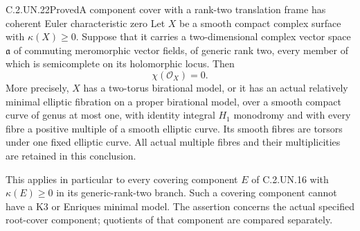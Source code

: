\begin{statement}{C.2.UN.22}{Proved}{A component cover with a rank-two translation frame has coherent Euler characteristic zero}
Let $X$ be a smooth compact complex surface with
$\kappa(X)\ge0$. Suppose that it carries a two-dimensional
complex vector space $\mathfrak a$ of commuting meromorphic
vector fields, of generic rank two, every member of which
is semicomplete on its holomorphic locus. Then
\[
                         \chi(\mathcal O_X)=0.
                                                               \tag{C.RF.5}
\]
More precisely, $X$ has a two-torus birational model,
or it has an actual relatively minimal elliptic fibration
on a proper birational model, over a smooth compact curve
of genus at most one, with identity integral $H_1$ monodromy
and with every fibre a positive multiple of a smooth elliptic
curve. Its smooth fibres are torsors under one fixed elliptic
curve. All actual multiple fibres and their multiplicities
are retained in this conclusion.

This applies in particular to every covering component
$E$ of C.2.UN.16 with $\kappa(E)\ge0$ in its
generic-rank-two branch. Such a covering component cannot
have a K3 or Enriques minimal model. The assertion concerns
the actual specified root-cover component; quotients of that
component are compared separately.
\end{statement}

